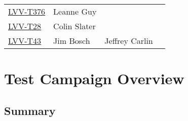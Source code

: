 \documentclass[DM,lsstdraft,STR,toc]{lsstdoc}
\begin{document}
\begin{longtable}{p{3cm}p{3cm}p{3cm}p{6cm}}
\begin{minipage}[]{6cm}
\smallskip
{\small  }
\medskip
\end{minipage}
\\ \hline
\href{https://jira.lsstcorp.org/secure/Tests.jspa#/testCase/LVV-T376}{LVV-T376}
& {\small Leanne Guy } & {\small  } &
\begin{minipage}[]{6cm}
\smallskip
{\small  }
\medskip
\end{minipage}
\\ \hline
\href{https://jira.lsstcorp.org/secure/Tests.jspa#/testCase/LVV-T28}{LVV-T28}
& {\small Colin Slater } & {\small  } &
\begin{minipage}[]{6cm}
\smallskip
{\small  }
\medskip
\end{minipage}
\\ \hline
\href{https://jira.lsstcorp.org/secure/Tests.jspa#/testCase/LVV-T43}{LVV-T43}
& {\small Jim Bosch } & {\small Jeffrey Carlin } &
\begin{minipage}[]{6cm}
\smallskip
{\small  }
\medskip
\end{minipage}
\\ \hline
\end{longtable}

\newpage

\section{Test Campaign Overview}
\label{sect:overview}

\subsection{Summary}
\label{sect:summarytable}
\end{document}

